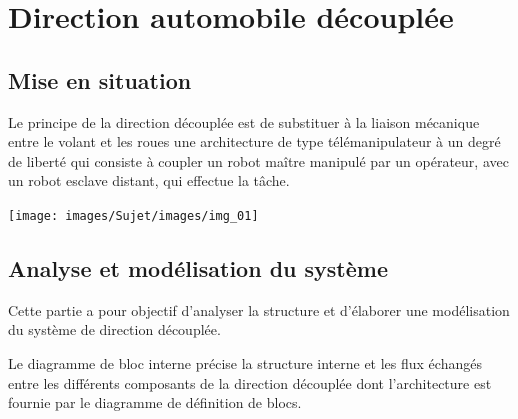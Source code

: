 \documentclass[10pt,fleqn]{article} %
\begin{document}
\ifprof
\begin{corrige}

\end{corrige}
\else
\fi


\section{Direction automobile découplée}

\subsection{Mise en situation}

\noindent\begin{minipage}[c]{.67\linewidth}
\indent Le principe de la direction découplée est de substituer à la liaison mécanique entre le volant et les roues une architecture de type télémanipulateur à un degré de liberté qui consiste à coupler un robot maître manipulé par un opérateur, avec un robot esclave distant, qui effectue la tâche. 
\end{minipage}\hfill
\begin{minipage}[c]{.3\linewidth}
\begin{center}
\texttt{[image: images/Sujet/images/img\_01]}
\end{center}
\end{minipage}

\subsection{Analyse et modélisation du système}
\begin{obj}
Cette partie a pour objectif d'analyser la structure et d'élaborer une modélisation du système
de direction découplée.
\end{obj}
Le diagramme de bloc interne précise la structure interne et les flux échangés
entre les différents composants de la direction découplée dont l'architecture est fournie par le
diagramme de définition de blocs.
\end{document}
